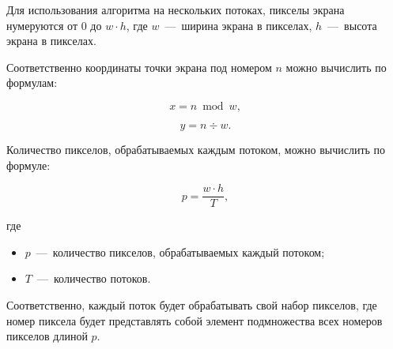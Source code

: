 Для использования алгоритма на нескольких потоках, пикселы экрана нумеруются от $0$ до $w \cdot h$, где $w$~---~ширина экрана в пикселах, $h$~---~высота экрана в пикселах.

Соответственно координаты точки экрана под номером $n$ можно вычислить по формулам:

\begin{equation}
	x = n \bmod w,
\end{equation}

\begin{equation}
	y = n \div w.
\end{equation}

Количество пикселов, обрабатываемых каждым потоком, можно вычислить по формуле:

\begin{equation}
	p = \frac{w \cdot h}{T},
\end{equation}

где \begin{itemize}
	\item $p$~---~количество пикселов, обрабатываемых каждый потоком;
	\item $T$~---~количество потоков.
\end{itemize}

Соответственно, каждый поток будет обрабатывать свой набор пикселов, где номер пиксела будет представлять собой элемент подмножества всех номеров пикселов длиной $p$.

\newpage